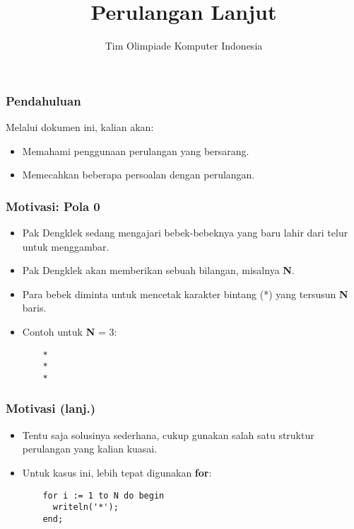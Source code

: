 

\title{Perulangan Lanjut}
\author{Tim Olimpiade Komputer Indonesia}
\date{}



\begin{frame}
\titlepage
\end{frame}

\begin{frame}
\frametitle{Pendahuluan}
Melalui dokumen ini, kalian akan:
\begin{itemize}
  \item Memahami penggunaan perulangan yang bersarang.
  \item Memecahkan beberapa persoalan dengan perulangan.
\end{itemize}
\end{frame}

\begin{frame}[fragile]
\frametitle{Motivasi: Pola 0}
\begin{itemize}
  \item Pak Dengklek sedang mengajari bebek-bebeknya yang baru lahir dari telur untuk menggambar.
  \item Pak Dengklek akan memberikan sebuah bilangan, misalnya \textbf{N}.
  \item Para bebek diminta untuk mencetak karakter bintang (*) yang tersusun \textbf{N} baris.
  \item Contoh untuk \textbf{N} = 3:
  \begin{lstlisting}
    *
    *
    *
  \end{lstlisting}
\end{itemize}
\end{frame}

\begin{frame}[fragile]
\frametitle{Motivasi (lanj.)}
\begin{itemize}
  \item Tentu saja solusinya sederhana, cukup gunakan salah satu struktur perulangan yang kalian kuasai.
  \item Untuk kasus ini, lebih tepat digunakan \textbf{for}:
  \begin{lstlisting}
    for i := 1 to N do begin
      writeln('*');
    end;
  \end{lstlisting}
\end{itemize}
\end{frame}

